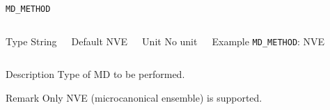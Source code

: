 \documentclass[xcolor=dvipsnames,t]{beamer}
\begin{document}
\begin{frame}[allowframebreaks]{\texttt{MD\_METHOD}} \label{MD_METHOD}
\vspace*{-12pt}
\begin{columns}
\begin{block}{Type}
String
\end{block}

\begin{block}{Default}
NVE
\end{block}

\begin{block}{Unit}
No unit
\end{block}

\begin{block}{Example}
\texttt{MD\_METHOD}: NVE
\end{block}
\end{columns}

\begin{block}{Description}
Type of MD to be performed. 
\end{block}

\begin{block}{Remark}
Only NVE (microcanonical ensemble) is supported.
\end{block}

\end{frame}
\end{document}
